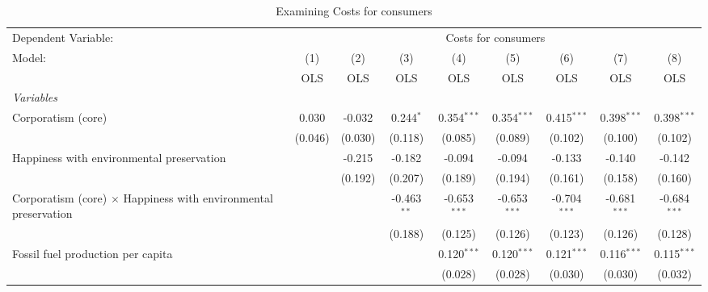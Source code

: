 
\begin{table}[htbp]
   \caption{Examining Costs for consumers}
   \centering
   \begin{tabular}{lcccccccc}
      \toprule
      Dependent Variable: & \multicolumn{8}{c}{Costs for consumers}\\
      Model:                                                                 & (1)     & (2)     & (3)           & (4)            & (5)            & (6)            & (7)            & (8)\\  
                                                                             &  OLS    & OLS     & OLS           & OLS            & OLS            & OLS            & OLS            & OLS\\  
      \midrule
      \emph{Variables}\\
      Corporatism (core)                                                     & 0.030   & -0.032  & 0.244$^{*}$   & 0.354$^{***}$  & 0.354$^{***}$  & 0.415$^{***}$  & 0.398$^{***}$  & 0.398$^{***}$\\   
                                                                             & (0.046) & (0.030) & (0.118)       & (0.085)        & (0.089)        & (0.102)        & (0.100)        & (0.102)\\   
      Happiness with environmental preservation                              &         & -0.215  & -0.182        & -0.094         & -0.094         & -0.133         & -0.140         & -0.142\\   
                                                                             &         & (0.192) & (0.207)       & (0.189)        & (0.194)        & (0.161)        & (0.158)        & (0.160)\\   
      Corporatism (core) $\times$ Happiness with environmental preservation  &         &         & -0.463$^{**}$ & -0.653$^{***}$ & -0.653$^{***}$ & -0.704$^{***}$ & -0.681$^{***}$ & -0.684$^{***}$\\   
                                                                             &         &         & (0.188)       & (0.125)        & (0.126)        & (0.123)        & (0.126)        & (0.128)\\   
      Fossil fuel production per capita                                      &         &         &               & 0.120$^{***}$  & 0.120$^{***}$  & 0.121$^{***}$  & 0.116$^{***}$  & 0.115$^{***}$\\   
                                                                             &         &         &               & (0.028)        & (0.028)        & (0.030)        & (0.030)        & (0.032)\\   

\end{tabular}
\end{table}
